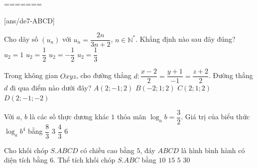 =======
\begin{name}
	{\tenchude}
	{\tendethi}
	{\tentruong}
	{\thoigian}
	\end{name}
\TN
{}[ans/de7-ABCD]
\begin{ex}%
	Cho dãy số $(u_n)$ với $u_n=\dfrac{2n}{3n+2}$, $n\in\mathbb{N}^*$. Khẳng định nào sau đây đúng?\vspace{3pt}
	\choice
	{$u_2=1$}
	{\True $u_2=\dfrac{1}{2}$}
	{$u_2=-\dfrac{1}{2}$}
	{$u_2=\dfrac{1}{3}$}
\end{ex}
\begin{ex}%
	Trong không gian $Oxyz$, cho đường thẳng $d\colon\dfrac{x-2}{2}=\dfrac{y+1}{-1}=\dfrac{z+2}{2}$. Đường thẳng $d$ đi qua điểm nào dưới đây?
	\choice
	{$A(2;-1;2)$}
	{$B(-2;1;2)$}
	{$C(2;1;2)$}
	{\True $D(2;-1;-2)$}
\end{ex}
\begin{ex}%
	Với $a$, $b$ là các số thực dương khác $1$ thỏa mãn $\log_a b=\dfrac{3}{2}$. Giá trị của biểu thức $\log_a b^4$ bằng\vspace{3pt}
	\choice
	{$\dfrac{8}{3}$}
	{$3$}
	{$\dfrac{4}{3}$}
	{\True $6$}
\end{ex}
\begin{ex}%
	Cho khối chóp $S.ABCD$ có chiều cao bằng $5$, đáy $ABCD$ là hình bình hành có diện tích bằng $6$. Thể tích khối chóp $S.ABC$ bằng
	\choice
	{$10$}
	{$15$}
	{\True $5$}
	{$30$}
\end{ex}

